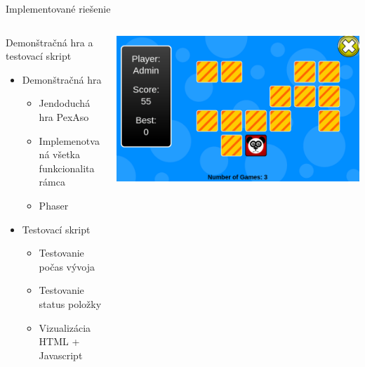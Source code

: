 \documentclass[10pt]{beamer}
\begin{document}
\begin{frame}[fragile]{Implementované riešenie}
	\begin{columns}
\begin{column}{0.5\textwidth}

   \begin{block}{Demonštračná hra a testovací skript}
		\begin{itemize}
            \item Demonštračná hra
                \begin{itemize}
                \item Jendoduchá hra PexAso
                \item Implemenotvaná všetka funkcionalita rámca
                \item Phaser
                \end{itemize}
            \item Testovací skript
                \begin{itemize}
                \item Testovanie počas vývoja
                \item Testovanie status položky
                \item Vizualizácia HTML + Javascript
                \end{itemize}
            \end{itemize}
	\end{block}
	
\end{column}
\begin{column}{0.5\textwidth}  %
    \begin{center}
     \includegraphics[width=1\textwidth]{fig/ukazka-hra.png}
     \end{center}
\end{column}
\end{columns}
\end{frame}
\end{document}
